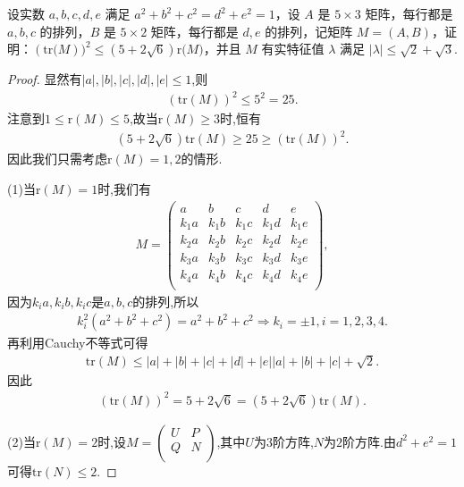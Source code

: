 \documentclass[../../main.tex]{subfiles}%
\begin{document}
\begin{example}
设实数 $a,b,c,d,e$ 满足 $a^2 + b^2 + c^2 = d^2 + e^2 = 1$，设 $A$ 是 $5 \times 3$ 矩阵，每行都是 $a,b,c$ 的排列，$B$ 是 $5 \times 2$ 矩阵，每行都是 $d,e$ 的排列，记矩阵 $M = (A,B)$，证明：$(\mathrm{tr(}M))^2\leqslant \left( 5+2\sqrt{6} \right) \mathrm{r(}M)$，并且 $M$ 有实特征值 $\lambda$ 满足 $|\lambda| \leqslant  \sqrt{2} + \sqrt{3}$.
\end{example}
\begin{proof}

显然有$|a|,|b|,|c|,|d|,|e|\leqslant 1$,则
\begin{align*}
(\mathrm{tr}(M))^2\leqslant 5^2=25.
\end{align*}
注意到$1\leqslant \mathrm{r}(M) \leqslant 5$,故当$\mathrm{r}(M) \geqslant 3$时,恒有
\begin{align*}
\left( 5+2\sqrt{6} \right) \mathrm{tr}(M)\geqslant 25\geqslant (\mathrm{tr}(M))^2.
\end{align*}
因此我们只需考虑$\mathrm{r}(M) =1,2$的情形.

(1)当$\mathrm{r}(M) =1$时,我们有
\begin{align*}
M=\begin{pmatrix}
a&		b&		c&		d&		e\\
k_1a&		k_1b&		k_1c&		k_1d&		k_1e\\
k_2a&		k_2b&		k_2c&		k_2d&		k_2e\\
k_3a&		k_3b&		k_3c&		k_3d&		k_3e\\
k_4a&		k_4b&		k_4c&		k_4d&		k_4e\\
\end{pmatrix},
\end{align*}
因为$k_ia,k_ib,k_ic$是$a,b,c$的排列,所以
\begin{align*}
k_{i}^{2}\left( a^2+b^2+c^2 \right) =a^2+b^2+c^2\Rightarrow k_i=\pm 1,i=1,2,3,4.
\end{align*}
再利用Cauchy不等式可得
\begin{align*}
\mathrm{tr}\left( M \right) \leqslant |a|+|b|+|c|+|d|+|e| |a|+|b|+|c|+\sqrt{2}.
\end{align*}
因此
\begin{align*}
\left( \mathrm{tr}\left( M \right) \right) ^2=5+2\sqrt{6}=\left( 5+2\sqrt{6} \right) \mathrm{tr}(M).
\end{align*}

(2)当$\mathrm{r}(M) =2$时,设$M=\begin{pmatrix}
U&		P\\
Q&		N\\
\end{pmatrix}$,其中$U$为$3$阶方阵,$N$为$2$阶方阵.由$d^2+e^2=1$可得$\mathrm{tr}(N) \leqslant 2$.


\end{proof}
\end{document}
